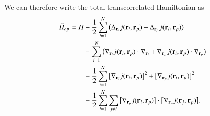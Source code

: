 \documentclass[aip,jcp,reprint,noshowkeys,superscriptaddress]{revtex4-1}
\newcommand{\bri}[1]{{\bf r}_{#1}}
\newcommand{\Hept}[0]{\tilde{H}_{ep}}
\begin{document}
We can therefore write the total transcorrelated Hamiltonian as 
\begin{equation}
 \begin{aligned}
 \Hept  = H& -\frac{1}{2} \sum_{i=1}^N \big(\Delta_{\bri{i}} j(\bri{i},\bri{p}) + \Delta_{\bri{p}} j(\bri{i},\bri{p}) \big) \\
           & -\sum_{i=1}^N \big(\nabla_{\bri{i}} j(\bri{i},\bri{p}) \cdot\nabla_{\bri{i}} + \nabla_{\bri{p}} j(\bri{i},\bri{p}) \cdot \nabla_{\bri{p}} \big) \\
           & -\frac{1}{2} \sum_{i=1}^N \big[ \nabla_{\bri{i}} j(\bri{i},\bri{p})\big]^2 + \big[ \nabla_{\bri{p}} j(\bri{i},\bri{p})\big]^2 \\
           & -\frac{1}{2} \sum_{i=1}^N \sum_{j\ne i} \big[ \nabla_{\bri{p}} j(\bri{i},\bri{p})\big] \cdot \big[ \nabla_{\bri{p}} j(\bri{j},\bri{p})\big].
 \end{aligned}
\end{equation}



\end{document}
